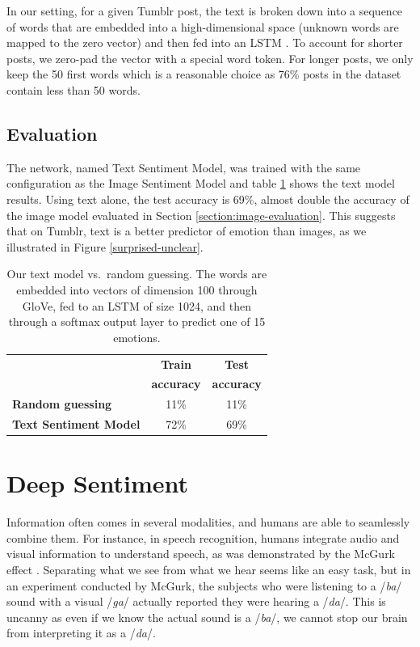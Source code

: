 \documentclass{article} %
\begin{document}
In our setting, for a given Tumblr post, the text is broken down into a sequence of words that are embedded into a high-dimensional space (unknown words are mapped to the zero vector) and then fed into an LSTM \citep{Hochreiter-97}. To account for shorter posts, we zero-pad the vector with a special word token. For longer posts, we only keep the 50 first words which is a reasonable choice as 76\% posts in the dataset contain less than 50 words.

\subsection{Evaluation}
The network, named Text Sentiment Model, was trained with the same configuration as the Image Sentiment Model and table \ref{text-results} shows the text model results. Using text alone, the test accuracy is 69\%, almost double the accuracy of the image model evaluated in Section \ref{section:image-evaluation}. This suggests that on Tumblr, text is a better predictor of emotion than images, as we illustrated in Figure \ref{surprised-unclear}.
\begin{table}[H]
\caption{Our text model vs.~random guessing. The words are embedded into vectors of dimension 100 through GloVe, fed to an LSTM of size 1024, and then through a softmax output layer to predict one of 15 emotions.}
\begin{center}
    \begin{tabular}{l | c | c}
    & \textbf{Train} & \textbf{Test} \\
    & \textbf{accuracy} & \textbf{accuracy} \\ \hline
    \textbf{Random guessing} & 11\% & 11\% \\ \hline
    \textbf{Text Sentiment Model}  & 72\% & 69\% \\
    \end{tabular}
\end{center}
\label{text-results}
\end{table}

\section{Deep Sentiment}
Information often comes in several modalities, and humans are able to seamlessly combine them. For instance, in speech recognition, humans integrate audio and visual information to understand speech, as was demonstrated by the McGurk effect \citep{McGurk-76}. Separating what we see from what we hear seems like an easy task, but in an experiment conducted by McGurk, the subjects who were listening to a /{\em ba}/ sound with a visual /{\em ga}/ actually reported they were hearing a /{\em da}/. This is uncanny as even if we know the actual sound is a /{\em ba}/, we cannot stop our brain from interpreting it as a /{\em da}/.
\end{document}
